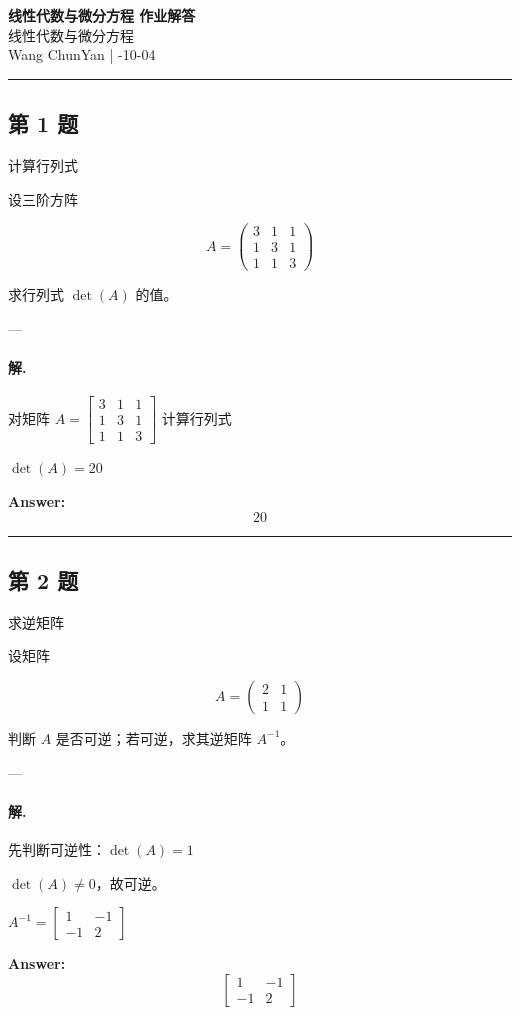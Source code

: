 \documentclass[12pt, a4paper]{ctexart}
\newcommand{\problem}[1]{\subsection*{第 #1 题}}
\newcommand{\solution}{\paragraph{解.}}
\begin{document}
\begin{center}
    {\LARGE\bfseries 线性代数与微分方程 作业解答} \\[0.5em]
    {\large 线性代数与微分方程} \\[0.3em]
    Wang ChunYan \quad | -10-04
\end{center}

\hrule
\vspace{1em}
\problem{1}

计算行列式

设三阶方阵

$$
A = \begin{pmatrix} 3 & 1 & 1 \\ 1 & 3 & 1 \\ 1 & 1 & 3 \end{pmatrix}
$$

求行列式 $\det(A)$ 的值。

---

\solution

对矩阵 $A = \begin{bmatrix}3 & 1 & 1 \\ 1 & 3 & 1 \\ 1 & 1 & 3\end{bmatrix}$ 计算行列式

$\det(A) = 20$

\textbf{Answer:}
\[\boxed{20}\]

\vspace{1em}
\hrule
\vspace{1em}

\problem{2}

求逆矩阵

设矩阵

$$
A = \begin{pmatrix} 2 & 1 \\ 1 & 1 \end{pmatrix}
$$

判断 $A$ 是否可逆；若可逆，求其逆矩阵 $A^{-1}$。

---

\solution

先判断可逆性：$\det(A) = 1$

$\det(A) \neq 0$，故可逆。

$A^{-1} = \begin{bmatrix}1 & -1 \\ -1 & 2\end{bmatrix}$

\textbf{Answer:}
\[\begin{bmatrix}1 & -1 \\ -1 & 2\end{bmatrix}\]
\end{document}
